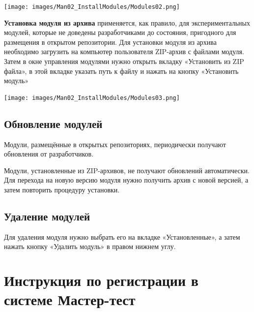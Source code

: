 \documentclass[
  12pt,
]{book}
\begin{document}
\texttt{[image: images/Man02\_InstallModules/Modules02.png]}

\textbf{Установка модуля из архива} применяется, как правило, для экспериментальных модулей, которые не доведены разработчиками до состояния, пригодного для размещения в открытом репозитории.
Для установки модуля из архива необходимо загрузить на компьютер пользователя ZIP-архив с файлами модуля. Затем в окне управления модулями нужно открыть вкладку «Установить из ZIP файла», в этой вкладке указать путь к файлу и нажать на кнопку «Установить модуль»

\texttt{[image: images/Man02\_InstallModules/Modules03.png]}

\hypertarget{manual-plugins-update}{%
\section{Обновление модулей}\label{manual-plugins-update}}

Модули, размещённые в открытых репозиториях, периодически получают обновления от разработчиков.

Модули, установленные из ZIP-архивов, не получают обновлений автоматически. Для перехода на новую версию модуля нужно получить архив с новой версией, а затем повторить процедуру установки.

\hypertarget{manual-plugins-uninstall}{%
\section{Удаление модулей}\label{manual-plugins-uninstall}}

Для удаления модуля нужно выбрать его на вкладке «Установленные», а затем нажать кнопку «Удалить модуль» в правом нижнем углу.

\hypertarget{mastertest}{%
\chapter{Инструкция по регистрации в системе Мастер-тест}\label{mastertest}}
\end{document}

